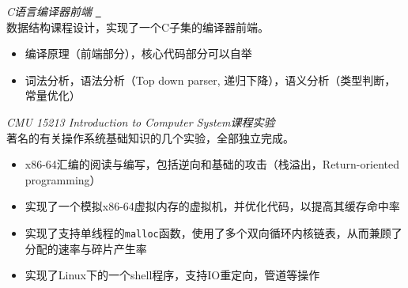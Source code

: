 \documentclass{uniquecv}
\begin{document}
{\it C语言编译器前端}
\quad \href{https://github.com/colinaaa/hello-ds}{{\color{gray}{\faLink}}~}
\vspace{0.4ex}
\\
数据结构课程设计，实现了一个C子集的编译器前端。
\begin{itemize}
  \item 编译原理（前端部分），核心代码部分可以自举
  \item 词法分析，语法分析（Top down parser, 递归下降），语义分析（类型判断，常量优化）
\end{itemize}

{\it CMU 15213 Introduction to Computer System课程实验}
\vspace{0.4ex}
\\
著名的有关操作系统基础知识的几个实验，全部独立完成。
\begin{itemize}
  \item x86-64汇编的阅读与编写，包括逆向和基础的攻击（栈溢出，Return-oriented programming）
  \item 实现了一个模拟x86-64虚拟内存的虚拟机，并优化代码，以提高其缓存命中率
  \item 实现了支持单线程的{\tt malloc}函数，使用了多个双向循环内核链表，从而兼顾了分配的速率与碎片产生率
  \item 实现了Linux下的一个shell程序，支持IO重定向，管道等操作
\end{itemize}
%
\end{document}
